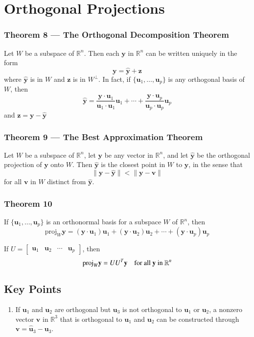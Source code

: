 \documentclass{article}
\begin{document}
\section*{Orthogonal Projections}

\subsubsection*{Theorem 8 --- The Orthogonal Decomposition Theorem}

Let $W$ be a subspace of $\mathbb{R}^n$. Then each $\mathbf{y}$ in $\mathbb{R}^n$ can be written
uniquely in the form
\[\mathbf{y}=\mathbf{\hat{y}}+\mathbf{z}\]
where $\mathbf{\hat{y}}$ is in $W$ and $\mathbf{z}$ is in $W^\perp$. In fact, if
$\{\mathbf{u}_1, \ldots, \mathbf{u}_p\}$ is any orthogonal basis of $W$, then
\[\mathbf{\hat{y}}=\frac{\mathbf{y}\cdot\mathbf{u}_1}{\mathbf{u}_1\cdot\mathbf{u}_1}\mathbf{u}_1+
\cdots+\frac{\mathbf{y}\cdot\mathbf{u}_p}{\mathbf{u}_p\cdot\mathbf{u}_p}\mathbf{u}_p\]
and $\mathbf{z}=\mathbf{y}-\mathbf{\hat{y}}$

\subsubsection*{Theorem 9 --- The Best Approximation Theorem}

Let $W$ be a subspace of $\mathbb{R}^n$, let $\mathbf{y}$ be any vector in $\mathbb{R}^n$, and let
$\mathbf{\hat{y}}$ be the orthogonal projection of $\mathbf{y}$ onto $W$. Then $\mathbf{\hat{y}}$
is the closest point in $W$ to $\mathbf{y}$, in the sense that
\[\|\mathbf{y}-\mathbf{\hat{y}}\|<\|\mathbf{y}-\mathbf{v}\|\]
for all $\mathbf{v}$ in $W$ distinct from $\mathbf{\hat{y}}$.

\subsubsection*{Theorem 10}
If $\{\mathbf{u}_1, \ldots, \mathbf{u}_p\}$ is an orthonormal basis for a subspace $W$ of
$\mathbb{R}^n$, then
\[\text{proj}_W \mathbf{y}=(\mathbf{y}\cdot\mathbf{u}_1)\mathbf{u}_1+(\mathbf{y}\cdot\mathbf{u}_2)
\mathbf{u}_2+\cdots +(\mathbf{y}\cdot\mathbf{u}_p)\mathbf{u}_p\]

If $U=\begin{bmatrix}\mathbf{u}_1 & \mathbf{u}_2 & \cdots & \mathbf{u}_p \end{bmatrix}$, then
\[\text{proj}_W\mathbf{y}=U U^T \mathbf{y}\quad\text{for all \textbf{y} in }\mathbb{R}^n\]

\subsection*{Key Points}
\begin{enumerate}
    \item If $\mathbf{u}_1$ and $\mathbf{u}_2$ are orthogonal but $\mathbf{u}_3$ is not orthogonal
    to $\mathbf{u}_1$ or $\mathbf{u}_2$, a nonzero vector $\mathbf{v}$ in $\mathbb{R}^3$ that is
    orthogonal to $\mathbf{u}_1$ and $\mathbf{u}_2$ can be constructed through
    $\mathbf{v}=\mathbf{\hat{u}}_3-\mathbf{u}_3$.
\end{enumerate}
\end{document}
